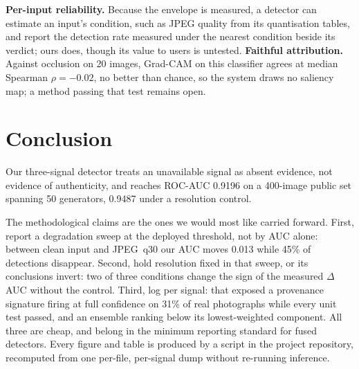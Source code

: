 \documentclass[conference]{IEEEtran}
\begin{document}
\textbf{Per-input reliability.} Because the envelope is measured, a detector
can estimate an input's condition, such as JPEG quality from its quantisation
tables, and report the detection rate measured under the nearest condition
beside its verdict; ours does, though its value to users is untested.
\textbf{Faithful attribution.} Against occlusion on 20 images, Grad-CAM on
this classifier agrees at median Spearman $\rho = -0.02$, no better than
chance, so the system draws no saliency map; a method passing that test
remains open.

\section{Conclusion}
\balance

Our three-signal detector treats an unavailable signal as absent evidence, not
evidence of authenticity, and reaches ROC-AUC 0.9196 on a 400-image public set
spanning 50 generators, 0.9487 under a resolution control.

The methodological claims are the ones we would most like carried forward.
First, report a degradation sweep at the deployed threshold, not by AUC alone:
between clean input and JPEG~q30 our AUC moves 0.013 while 45\% of detections
disappear. Second, hold resolution fixed in that sweep, or its conclusions
invert: two of three conditions change the sign of the measured $\Delta$AUC
without the control. Third, log per signal: that exposed a provenance signature
firing at full confidence on 31\% of real photographs while every unit test
passed, and an ensemble ranking below its lowest-weighted component. All three
are cheap, and belong in the minimum reporting standard for fused detectors.
Every figure and table is produced by a
script in the project repository, recomputed from one per-file, per-signal dump
without re-running inference.
\end{document}
